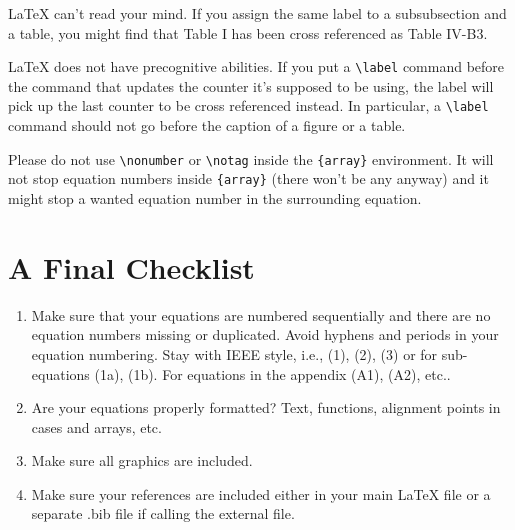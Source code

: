 \documentclass[lettersize,journal]{IEEEtran}
\begin{document}
{\LaTeX} can't read your mind. If you assign the same label to a
subsubsection and a table, you might find that Table I has been cross
referenced as Table IV-B3. 

{\LaTeX} does not have precognitive abilities. If you put a
\verb|\label| command before the command that updates the counter it's
supposed to be using, the label will pick up the last counter to be
cross referenced instead. In particular, a \verb|\label| command
should not go before the caption of a figure or a table.

Please do not use \verb|\nonumber| or \verb|\notag| inside the
\verb|{array}| environment. It will not stop equation numbers inside
\verb|{array}| (there won't be any anyway) and it might stop a wanted
equation number in the surrounding equation.

\balance

\section{A Final Checklist}
\begin{enumerate}{}{}
\item{Make sure that your equations are numbered sequentially and there are no equation numbers missing or duplicated. Avoid hyphens and periods in your equation numbering. Stay with IEEE style, i.e., (1), (2), (3) or for sub-equations (1a), (1b). For equations in the appendix (A1), (A2), etc.}. 
\item{Are your equations properly formatted? Text, functions, alignment points in cases and arrays, etc. }
\item{Make sure all graphics are included.}
\item{Make sure your references are included either in your main LaTeX file or a separate .bib file if calling the external file.}
\end{enumerate}
\end{document}
